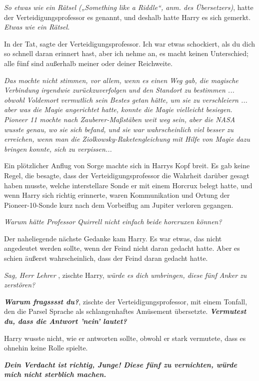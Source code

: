 \emph{So etwas wie ein Rätsel („Something like a Riddle“, anm. des
Übersetzers)}, hatte der Verteidigungsprofessor es genannt, und deshalb hatte
Harry es sich gemerkt.
\emph{Etwas wie ein Rätsel.}

\glqq{}In der Tat\grqq{}, sagte der Verteidigungsprofessor. \glqq{}Ich war etwas
schockiert, als du dich so schnell daran erinnert hast, aber ich nehme an, es
macht keinen Unterschied; alle fünf sind außerhalb meiner oder deiner
Reichweite.\grqq{}

\emph{Das mochte nicht stimmen, vor allem, wenn es einen Weg gab, die magische
Verbindung irgendwie zurückzuverfolgen und den Standort zu bestimmen ... obwohl
Voldemort vermutlich sein Bestes getan hätte, um sie zu verschleiern ... aber
was die Magie angerichtet hatte, konnte die Magie vielleicht besiegen. Pioneer
11 mochte nach Zauberer-Maßstäben weit weg sein, aber die NASA wusste genau, wo
sie sich befand, und sie war wahrscheinlich viel besser zu erreichen, wenn man
die Ziolkowsky-Raketengleichung mit Hilfe von Magie dazu bringen konnte, sich zu
verpissen...}

Ein plötzlicher Anflug von Sorge machte sich in Harrys Kopf breit. Es gab keine
Regel, die besagte, dass der Verteidigungsprofessor die Wahrheit darüber gesagt
haben musste, welche interstellare Sonde er mit einem Horcrux belegt hatte, und
wenn Harry sich richtig erinnerte, waren Kommunikation und Ortung der
Pioneer-10-Sonde kurz nach dem Vorbeiflug am Jupiter verloren gegangen.

\emph{Warum hätte Professor Quirrell nicht einfach beide horcruxen können?}

Der naheliegende nächste Gedanke kam Harry. Es war etwas, das nicht angedeutet
werden sollte, wenn der Feind nicht daran gedacht hatte. Aber es schien äußerst
wahrscheinlich, dass der Feind daran gedacht hatte.

\glqq{}\emph{Sag, Herr Lehrer\grqq{}} , zischte Harry, \glqq{}\emph{würde es dich
umbringen, diese fünf Anker zu zerstören?}\grqq{}

\glqq{}\textbf{\emph{Warum fragsssst du?}}\grqq{}, zischte der
Verteidigungsprofessor, mit einem Tonfall, den die Parsel Sprache als
schlangenhaftes Amüsement übersetzte. \glqq{}\textbf{\emph{Vermutest du, dass die
Antwort 'nein' lautet?}}\grqq{}

Harry wusste nicht, wie er antworten sollte, obwohl er stark vermutete, dass es
ohnehin keine Rolle spielte.

\glqq{}\textbf{\emph{Dein Verdacht ist richtig, Junge! Diese fünf zu vernichten,
würde mich nicht sterblich machen.}}\grqq{}

